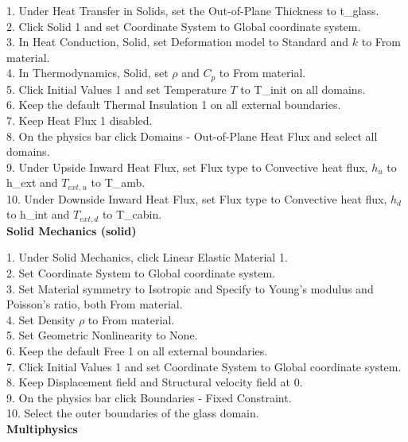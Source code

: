 1. Under Heat Transfer in Solids, set the Out-of-Plane Thickness to t\_glass.\\
2. Click Solid 1 and set Coordinate System to Global coordinate system.\\
3. In Heat Conduction, Solid, set Deformation model to Standard and $k$ to From material.\\
4. In Thermodynamics, Solid, set $\rho$ and $C_p$ to From material.\\
5. Click Initial Values 1 and set Temperature $T$ to T\_init on all domains.\\
6. Keep the default Thermal Insulation 1 on all external boundaries.\\
7. Keep Heat Flux 1 disabled.\\
8. On the physics bar click Domains - Out-of-Plane Heat Flux and select all domains.\\
9. Under Upside Inward Heat Flux, set Flux type to Convective heat flux, $h_u$ to h\_ext and $T_{ext,u}$ to T\_amb.\\
10. Under Downside Inward Heat Flux, set Flux type to Convective heat flux, $h_d$ to h\_int and $T_{ext,d}$ to T\_cabin.
\\
\textbf{Solid Mechanics (solid)}

1. Under Solid Mechanics, click Linear Elastic Material 1.\\
2. Set Coordinate System to Global coordinate system.\\
3. Set Material symmetry to Isotropic and Specify to Young's modulus and Poisson's ratio, both From material.\\
4. Set Density $\rho$ to From material.\\
5. Set Geometric Nonlinearity to None.\\
6. Keep the default Free 1 on all external boundaries.\\
7. Click Initial Values 1 and set Coordinate System to Global coordinate system.\\
8. Keep Displacement field and Structural velocity field at 0.\\
9. On the physics bar click Boundaries - Fixed Constraint.\\
10. Select the outer boundaries of the glass domain.
\\
\textbf{Multiphysics}

